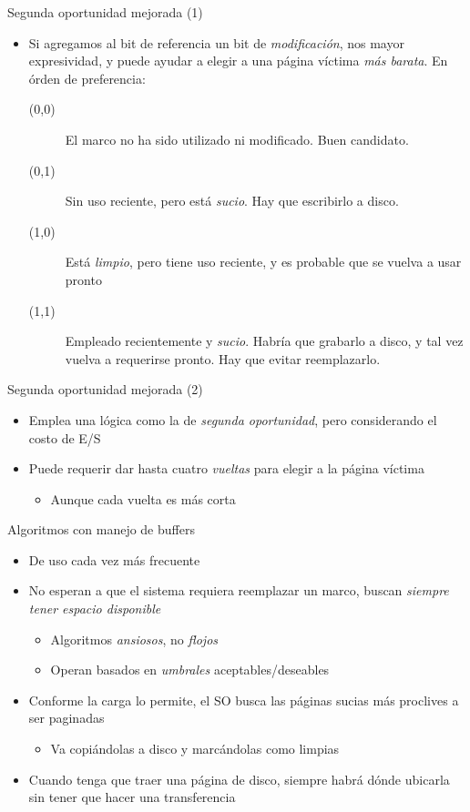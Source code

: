 \documentclass[presentation]{beamer}
\begin{document}
\begin{frame}[label={sec:org2e556d8}]{Segunda oportunidad mejorada (1)}
\begin{itemize}
\item Si agregamos al bit de referencia un bit de \emph{modificación}, nos
mayor expresividad, y puede ayudar a elegir a una página víctima
\emph{más barata}. En órden de preferencia:
\begin{description}
\item[{(0,0)}] El marco no ha sido utilizado ni modificado. Buen
candidato.
\item[{(0,1)}] Sin uso reciente, pero está \emph{sucio}. Hay que escribirlo a
disco.
\item[{(1,0)}] Está \emph{limpio}, pero tiene uso reciente, y es probable que
se vuelva a usar pronto
\item[{(1,1)}] Empleado recientemente y \emph{sucio}. Habría que grabarlo a
disco, y tal vez vuelva a requerirse pronto. Hay que
evitar reemplazarlo.
\end{description}
\end{itemize}
\end{frame}

\begin{frame}[label={sec:org13ea82c}]{Segunda oportunidad mejorada (2)}
\begin{itemize}
\item Emplea una lógica como la de \emph{segunda oportunidad}, pero
considerando el costo de E/S
\item Puede requerir dar hasta cuatro \emph{vueltas} para elegir a la página
víctima
\begin{itemize}
\item Aunque cada vuelta es más corta
\end{itemize}
\end{itemize}
\end{frame}

\begin{frame}[label={sec:org6d401bc}]{Algoritmos con manejo de buffers}
\begin{itemize}
\item De uso cada vez más frecuente
\item No esperan a que el sistema requiera reemplazar un marco, buscan
\emph{siempre tener espacio disponible}
\begin{itemize}
\item Algoritmos \emph{ansiosos}, no \emph{flojos}
\item Operan basados en \emph{umbrales} aceptables/deseables
\end{itemize}
\item Conforme la carga lo permite, el SO busca las páginas sucias más
proclives a ser paginadas
\begin{itemize}
\item Va copiándolas a disco y marcándolas como limpias
\end{itemize}
\item Cuando tenga que traer una página de disco, siempre habrá dónde
ubicarla sin tener que hacer una transferencia
\end{itemize}
\end{frame}
\end{document}
